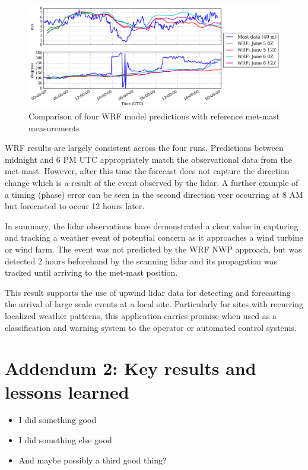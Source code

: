 \begin{figure}[H]
    \centering
        \includegraphics[width=1.0\textwidth]{graphics/results/balcony-addendum/wrf_mast_comparison.png}
    \caption{Comparison of four WRF model predictions with reference met-mast measurements}
    \label{fig:wrf_mast_comparison}
\end{figure}

WRF results are largely consistent across the four runs. Predictions between midnight and 6 PM UTC appropriately match the observational data from the met-mast. However, after this time the forecast does not capture the direction change which is a result of the event observed by the lidar. A further example of a timing (phase) error can be seen in the second direction veer occurring at 8 AM but forecasted to occur 12 hours later.

In summary, the lidar observations have demonstrated a clear value in capturing and tracking a weather event of potential concern as it approaches a wind turbine or wind farm. The event was not predicted by the WRF NWP approach, but was detected 2 hours beforehand by the scanning lidar and its propagation was tracked until arriving to the met-mast position.

This result supports the use of upwind lidar data for detecting and forecasting the arrival of large scale events at a local site. Particularly for sites with recurring localized weather patterns, this application carries promise when used as a classification and warning system to the operator or automated control systems.

\clearpage
\section{Addendum 2: Key results and lessons learned}
\label{sec:balcony_addendum2}

\begin{itemize}
    \item I did something good
    \item I did something else good
    \item And maybe possibly a third good thing?
\end{itemize}

